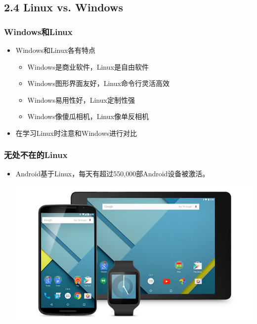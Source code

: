 \documentclass[xcolor=svgnames,presentation]{beamer}
\begin{document}
\subsection{2.4 Linux vs. Windows}
\label{sec-2-4}
\begin{frame}
\frametitle{Windows和Linux}
\label{sec-2-4-1}
\begin{itemize}

\item Windows和Linux各有特点
\label{sec-2-4-1-1}%
\begin{itemize}

\item Windows是商业软件，Linux是自由软件
\label{sec-2-4-1-1-1}%

\item Windows图形界面友好，Linux命令行灵活高效
\label{sec-2-4-1-1-2}%

\item Windows易用性好，Linux定制性强
\label{sec-2-4-1-1-3}%

\item Windows像傻瓜相机，Linux像单反相机
\label{sec-2-4-1-1-4}%
\end{itemize} %

\item 在学习Linux时注意和Windows进行对比
\label{sec-2-4-1-2}%
\end{itemize} %
\end{frame}
\begin{frame}
\frametitle{无处不在的Linux}
\label{sec-2-4-2}
\begin{itemize}

\item Android基于Linux，每天有超过550,000部Android设备被激活。
\label{sec-2-4-2-1}%
\begin{center}
\includegraphics[width=.9\linewidth]{img/android.jpg}
\end{center}

\end{itemize} %
\end{frame}
\end{document}
